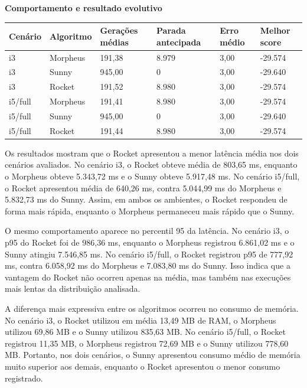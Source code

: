 \begin{table}[H]
\vspace{0.3cm}
\textbf{Comportamento e resultado evolutivo}
\vspace{0.15cm}

\begin{tabularx}{\textwidth}{|C{1.6cm}|X|C{2.5cm}|C{2.7cm}|C{2.0cm}|C{2.3cm}|}
\hline
\textbf{Cenário} & \textbf{Algoritmo} & \textbf{Gerações médias} & \textbf{Parada antecipada} & \textbf{Erro médio} & \textbf{Melhor score} \\
\hline
i3 & Morpheus & 191,38 & 8.979 & 3,00 & -29.574 \\
\hline
i3 & Sunny & 945,00 & 0 & 3,00 & -29.640 \\
\hline
i3 & Rocket & 191,52 & 8.980 & 3,00 & -29.574 \\
\hline
i5/full & Morpheus & 191,41 & 8.980 & 3,00 & -29.574 \\
\hline
i5/full & Sunny & 945,00 & 0 & 3,00 & -29.640 \\
\hline
i5/full & Rocket & 191,44 & 8.980 & 3,00 & -29.574 \\
\hline
\end{tabularx}
\endgroup
\fonteautores
\end{table}

Os resultados mostram que o Rocket apresentou a menor latência média nos dois cenários avaliados. No cenário i3, o Rocket obteve média de 803,65 ms, enquanto o Morpheus obteve 5.343,72 ms e o Sunny obteve 5.917,48 ms. No cenário i5/full, o Rocket apresentou média de 640,26 ms, contra 5.044,99 ms do Morpheus e 5.832,73 ms do Sunny. Assim, em ambos os ambientes, o Rocket respondeu de forma mais rápida, enquanto o Morpheus permaneceu mais rápido que o Sunny.

O mesmo comportamento aparece no percentil 95 da latência. No cenário i3, o p95 do Rocket foi de 986,36 ms, enquanto o Morpheus registrou 6.861,02 ms e o Sunny atingiu 7.546,85 ms. No cenário i5/full, o Rocket registrou p95 de 777,92 ms, contra 6.058,92 ms do Morpheus e 7.083,80 ms do Sunny. Isso indica que a vantagem do Rocket não ocorreu apenas na média, mas também nas execuções mais lentas da distribuição analisada.

A diferença mais expressiva entre os algoritmos ocorreu no consumo de memória. No cenário i3, o Rocket utilizou em média 13,49 MB de RAM, o Morpheus utilizou 69,86 MB e o Sunny utilizou 835,63 MB. No cenário i5/full, o Rocket registrou 11,35 MB, o Morpheus registrou 72,69 MB e o Sunny utilizou 778,60 MB. Portanto, nos dois cenários, o Sunny apresentou consumo médio de memória muito superior aos demais, enquanto o Rocket apresentou o menor consumo registrado.

